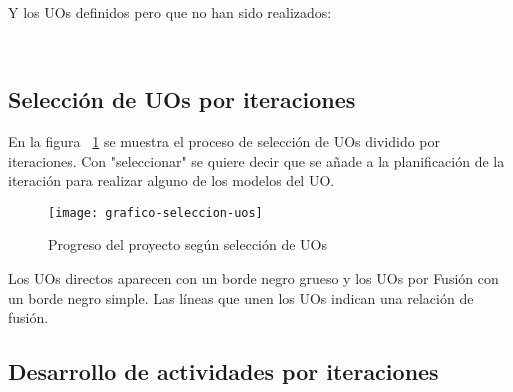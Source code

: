 \vspace{0.1cm}

\noindent
{}\\

\vspace{0.1cm}

Y los UOs definidos pero que no han sido realizados:\\

\vspace{0.1cm}

\noindent
{}\\

\vspace{0.1cm}

\subsection{Selección de UOs por iteraciones}
\label{dgp:uos-iteraciones-creacion}

En la figura ~\ref{fig:grafico-seleccion-uos} se muestra el proceso de selección de UOs dividido por iteraciones. Con "seleccionar" se quiere decir que se añade a la planificación de la iteración para realizar alguno de los modelos del UO.

\begin{figure}[h]
	\texttt{[image: grafico-seleccion-uos]}
	\caption{Progreso del proyecto según selección de UOs}
	\label{fig:grafico-seleccion-uos}
\end{figure}

Los UOs directos aparecen con un borde negro grueso y los UOs por Fusión con un borde negro simple. Las líneas que unen los UOs indican una relación de fusión.\\

\subsection{Desarrollo de actividades por iteraciones}
\label{dgp:desarrollo-actividades}

